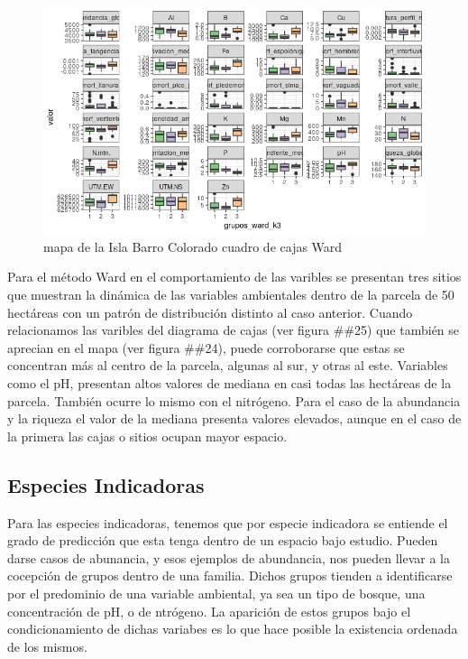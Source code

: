 \documentclass[11pt,]{article}
\begin{document}
\begin{figure}
\centering
\includegraphics[width=1.00000\textwidth]{cuadro_cajas_ward.png}
\caption{mapa de la Isla Barro Colorado cuadro de cajas Ward
\label{fig:bci_map}}
\end{figure}

Para el método Ward en el comportamiento de las varibles se presentan
tres sitios que muestran la dinámica de las variables ambientales dentro
de la parcela de 50 hectáreas con un patrón de distribución distinto al
caso anterior. Cuando relacionamos las varibles del diagrama de cajas
(ver figura \#\#25) que también se aprecian en el mapa (ver figura
\#\#24), puede corroborarse que estas se concentran más al centro de la
parcela, algunas al sur, y otras al este. Variables como el pH,
presentan altos valores de mediana en casi todas las hectáreas de la
parcela. También ocurre lo mismo con el nitrógeno. Para el caso de la
abundancia y la riqueza el valor de la mediana presenta valores
elevados, aunque en el caso de la primera las cajas o sitios ocupan
mayor espacio.

\subsection{Especies Indicadoras}\label{especies-indicadoras}

Para las especies indicadoras, tenemos que por especie indicadora se
entiende el grado de predicción que esta tenga dentro de un espacio bajo
estudio. Pueden darse casos de abunancia, y esos ejemplos de abundancia,
nos pueden llevar a la cocepción de grupos dentro de una familia. Dichos
grupos tienden a identificarse por el predominio de una variable
ambiental, ya sea un tipo de bosque, una concentración de pH, o de
ntrógeno. La aparición de estos grupos bajo el condicionamiento de
dichas variabes es lo que hace posible la existencia ordenada de los
mismos.
\end{document}

